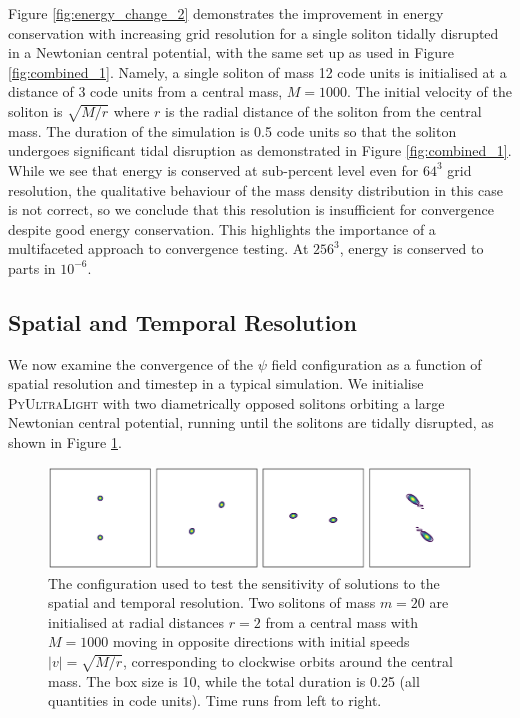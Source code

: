 \documentclass[a4paper,11pt]{article}
\newcommand{\PyUltraLight}{\textsc{PyUltraLight}\xspace}
\begin{document}
Figure \ref{fig:energy_change_2} demonstrates the improvement in energy conservation with increasing grid resolution for a single soliton tidally disrupted in a Newtonian central potential, with the same set up as used in Figure \ref{fig:combined_1}. Namely, a single soliton of mass 12 code units is initialised at a distance of 3 code units from a central mass, $M=1000$. The initial velocity of the soliton is $\sqrt{M/r}$ where $r$ is the radial distance of the soliton from the central mass. The duration of the simulation is 0.5 code units so that the soliton undergoes significant tidal disruption as demonstrated in Figure \ref{fig:combined_1}. While we see that energy is conserved at sub-percent level even for $64^3$ grid resolution, the qualitative behaviour of the mass density distribution in this case is not correct, so we conclude that this resolution is insufficient for convergence despite good energy conservation. This highlights the importance of a multifaceted approach to convergence testing. At $256^3$, energy is conserved to parts in $10^{-6}$.

\subsection{Spatial and Temporal Resolution}\label{sec:resolution}

We now examine the  convergence of the $\psi$ field configuration as a function of spatial resolution and timestep in a typical simulation. We initialise \PyUltraLight with two  diametrically opposed solitons orbiting a large Newtonian central potential, running until the solitons are tidally disrupted, as shown in Figure \ref{fig:disruption}. 

\begin{figure}
  \includegraphics[width=1.\textwidth,trim=0 0 0 0,clip]{first_and_last}
  \caption{The configuration used to test the sensitivity of solutions to the spatial and temporal resolution. Two solitons of mass $m=20$ are initialised at radial distances $r=2$ from a central mass with $M=1000$ moving in opposite directions with initial speeds $\vert v\vert=\sqrt{M/r}$, corresponding to clockwise orbits around the central mass. The  box size is 10, while the total duration is 0.25 (all quantities in code units). Time runs from left to right. }  \label{fig:disruption}
\end{figure}
\end{document}
